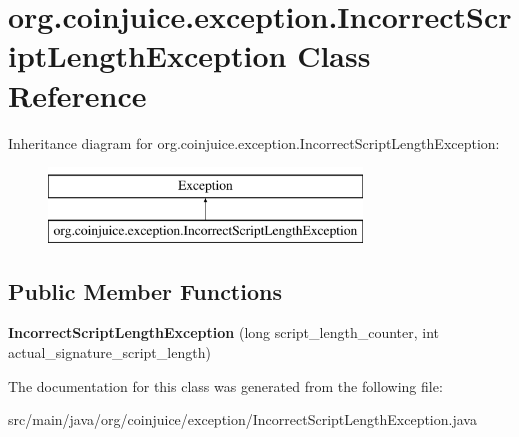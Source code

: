 \hypertarget{classorg_1_1coinjuice_1_1exception_1_1_incorrect_script_length_exception}{\section{org.\-coinjuice.\-exception.\-Incorrect\-Script\-Length\-Exception Class Reference}
\label{classorg_1_1coinjuice_1_1exception_1_1_incorrect_script_length_exception}
}
Inheritance diagram for org.\-coinjuice.\-exception.\-Incorrect\-Script\-Length\-Exception\-:\begin{figure}[H]
\begin{center}
\leavevmode
\includegraphics[height=2.000000cm]{classorg_1_1coinjuice_1_1exception_1_1_incorrect_script_length_exception}
\end{center}
\end{figure}
\subsection*{Public Member Functions}
\begin{DoxyCompactItemize}
\item 
\hypertarget{classorg_1_1coinjuice_1_1exception_1_1_incorrect_script_length_exception_ae147876d032487a6350bdfc9b4eae3cc}{{\bfseries Incorrect\-Script\-Length\-Exception} (long script\-\_\-length\-\_\-counter, int actual\-\_\-signature\-\_\-script\-\_\-length)}\label{classorg_1_1coinjuice_1_1exception_1_1_incorrect_script_length_exception_ae147876d032487a6350bdfc9b4eae3cc}

\end{DoxyCompactItemize}


The documentation for this class was generated from the following file\-:\begin{DoxyCompactItemize}
\item 
src/main/java/org/coinjuice/exception/Incorrect\-Script\-Length\-Exception.\-java\end{DoxyCompactItemize}
